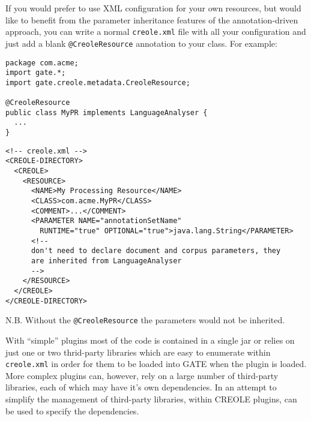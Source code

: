 
If you would prefer to use XML configuration for your own resources, but would
like to benefit from the parameter inheritance features of the
annotation-driven approach, you can write a normal {\tt creole.xml} file with
all your configuration and just add a blank \verb|@CreoleResource| annotation
to your class.  For example:
\begin{lstlisting}
package com.acme;
import gate.*;
import gate.creole.metadata.CreoleResource;

@CreoleResource
public class MyPR implements LanguageAnalyser {
  ...
}
\end{lstlisting}

\begin{small}\begin{verbatim}
<!-- creole.xml -->
<CREOLE-DIRECTORY>
  <CREOLE>
    <RESOURCE>
      <NAME>My Processing Resource</NAME>
      <CLASS>com.acme.MyPR</CLASS>
      <COMMENT>...</COMMENT>
      <PARAMETER NAME="annotationSetName"
        RUNTIME="true" OPTIONAL="true">java.lang.String</PARAMETER>
      <!--
      don't need to declare document and corpus parameters, they
      are inherited from LanguageAnalyser
      -->
    </RESOURCE>
  </CREOLE>
</CREOLE-DIRECTORY>
\end{verbatim}\end{small}

N.B. Without the \verb|@CreoleResource| the parameters would not be inherited.


With ``simple'' plugins most of the code is contained in a single jar or relies
on just one or two thrid-party libraries which are easy to enumerate within
{\tt creole.xml} in order for them to be loaded into GATE when the plugin is
loaded. More complex plugins can, however, rely on a large number of third-party
libraries, each of which may have it's own dependencies. In an attempt to
simplify the management of third-party libraries, within CREOLE plugins,
 can be used to specify the
dependencies.

